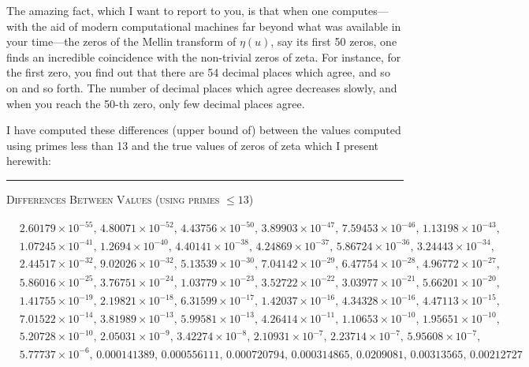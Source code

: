 \documentclass{article}
\begin{document}
\begin{large}
    
 \medskip
 


The amazing fact, which I want to report to you, is that when one computes—with the aid of modern computational machines far beyond what was available in your time—the zeros of the Mellin transform of $\eta(u)$,   say its first 50 zeros, one finds an incredible coincidence with the non-trivial zeros of zeta. For instance, for the first zero, you find out that there are 54 decimal places which agree, and so on and so forth. The number of decimal places which agree decreases slowly, and when you reach the 50-th zero, only  few decimal places  agree.


I have computed these differences (upper bound of) between the values computed
using primes less than 13 and the true values of zeros of zeta which I present herewith:
\end{large}
\vspace{0.1cm}

\begin{center}
\rule{0.95\textwidth}{0.4pt}
\end{center}

\begin{center}
\textsc{Differences Between Values (using primes $\le 13$)}
\end{center}

\small
\begin{align*}
&2.60179 \times 10^{-55},\, 4.80071 \times 10^{-52},\, 4.43756 \times 10^{-50},\, 3.89903 \times 10^{-47},\, 7.59453 \times 10^{-46},\, 1.13198 \times 10^{-43},\\
&1.07245 \times 10^{-41},\, 1.2694 \times 10^{-40},\, 4.40141 \times 10^{-38},\, 4.24869 \times 10^{-37},\, 5.86724 \times 10^{-36},\, 3.24443 \times 10^{-34},\\
&2.44517 \times 10^{-32},\, 9.02026 \times 10^{-32},\, 5.13539 \times 10^{-30},\, 7.04142 \times 10^{-29},\, 6.47754 \times 10^{-28},\, 4.96772 \times 10^{-27},\\
& 5.86016 \times 10^{-25},\, 3.76751 \times 10^{-24},\, 1.03779 \times 10^{-23},\, 3.52722 \times 10^{-22},\, 3.03977 \times 10^{-21},\, 5.66201 \times 10^{-20},\\
&1.41755 \times 10^{-19},\, 2.19821 \times 10^{-18},\, 6.31599 \times 10^{-17},\, 1.42037 \times 10^{-16},\, 4.34328 \times 10^{-16},\, 4.47113 \times 10^{-15},\\
& 7.01522 \times 10^{-14},\, 3.81989 \times 10^{-13}, \, 5.99581 \times 10^{-13},\, 4.26414 \times 10^{-11},\, 1.10653 \times 10^{-10},\, 1.95651 \times 10^{-10},\\
&5.20728 \times 10^{-10},\, 2.05031 \times 10^{-9},\, 3.42274 \times 10^{-8},\, 2.10931 \times 10^{-7},\, 2.23714 \times 10^{-7},\, 5.95608 \times 10^{-7},\\
& 5.77737 \times 10^{-6},\, 0.000141389,\, 0.000556111,\, 0.000720794,\, 0.000314865,\, 0.0209081,\, 0.00313565,\, 0.00212727
\end{align*}
\normalsize
\end{document}
